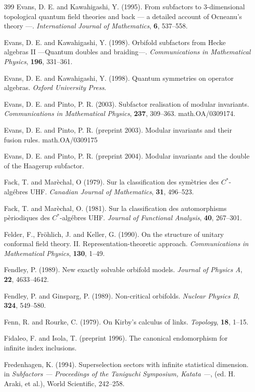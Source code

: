 \documentclass[12pt]{article}
\theoremstyle{plain}
\theoremstyle{definition}
\numberwithin{equation}{section}
\begin{document}
\begin{thebibliography} {399}
Evans, D. E. and Kawahigashi, Y. (1995).
From subfactors to $3$-dimensional topological
quantum field theories and back --- a detailed 
account of Ocneanu's theory ---.
{\em International Journal of Mathematics},
{\bf 6}, 537--558.

Evans, D. E. and Kawahigashi, Y. (1998).
Orbifold subfactors from Hecke algebras II
---Quantum doubles and braiding---.
{\em Communications in Mathematical Physics},
{\bf 196}, 331--361.

Evans, D. E. and Kawahigashi, Y. (1998).
Quantum symmetries on operator algebras.
{\em Oxford University Press}.

Evans, D. E. and Pinto, P. R. (2003).
Subfactor realisation of modular invariants.
{\em Communications in Mathematical Physics},
{\bf 237}, 309--363.
math.OA/0309174.

Evans, D. E. and Pinto, P. R. (preprint 2003).
Modular invariants and their fusion rules.
math.OA/0309175

Evans, D. E. and Pinto, P. R. (preprint 2004).
Modular invariants and the double of the Haagerup subfactor.

Fack, T. and Mar\`echal, O (1979).
Sur la classification des sym\`etries des 
$C^*$-alg\'ebres UHF.
{\em Canadian Journal of Mathematics},
{\bf 31}, 496--523.

Fack, T. and Mar\`echal, O. (1981).
Sur la classification des automorphisms 
p\`eriodiques des
$C^*$-alg\'ebres UHF.
{\em Journal of Functional Analysis},
{\bf 40}, 267--301.

Felder, F., Fr\"ohlich, J. and Keller, G. (1990).
On the structure of unitary conformal field theory. 
II. Representation-theoretic approach.
{\em Communications in  Mathematical Physics}, 
{\bf 130},  1--49.

Fendley, P. (1989).
New exactly solvable orbifold models.
{\em Journal of Physics A}, {\bf 22}, 4633--4642.

Fendley, P. and Ginsparg, P. (1989).
Non-critical orbifolds.
{\em Nuclear Physics B},
{\bf 324}, 549--580.

Fenn, R. and Rourke, C. (1979).
On Kirby's calculus of links.
{\em Topology}, {\bf 18}, 1--15.

Fidaleo, F. and Isola, T. (preprint 1996).
The canonical endomorphism for infinite index inclusions.

Fredenhagen, K. (1994).
Superselection sectors with infinite statistical dimension.
in {\em Subfactors ---
Proceedings of the Taniguchi Symposium, Katata ---},
(ed. H. Araki, et al.),
World Scientific, 242--258.


\end{thebibliography}
\end{document}
